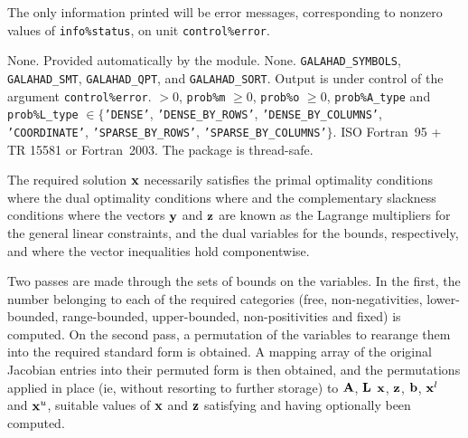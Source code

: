 \documentclass{galahad}
\begin{document}
\galinfo
The only information printed will be error messages, corresponding to 
nonzero values of {\tt info\%status}, on unit {\tt control\%error}. 


\galgeneral

\galcommon None.
\galworkspace Provided automatically by the module.
\galroutines None. 
\galmodules 
{\tt GALAHAD\_SY\-M\-BOLS}, 
{\tt GALAHAD\_SMT}, 
{\tt GALAHAD\_QPT},
and {\tt GALAHAD\_SORT}.
\galio Output is under control of the argument {\tt control\%error}.
 $> 0$, {\tt prob\%m} $\geq  0$, 
 {\tt prob\%o} $\geq  0$, 
 {\tt prob\%A\_type} and {\tt prob\%L\_type} $\in \{${\tt 'DENSE'}, 
 {\tt 'DENSE\_BY\_ROWS'},  {\tt 'DENSE\_BY\_COLUMNS'}, 
 {\tt 'COORDINATE'}, {\tt 'SPARSE\_BY\_ROWS'},
 {\tt 'SPARSE\_BY\_COLUMNS'}$\}$. 
\galportability ISO Fortran~95 + TR 15581 or Fortran~2003. 
The package is thread-safe.


\galmethod
The required solution ${\mathbf{x}}$ necessarily satisfies 
the primal optimality conditions
where
the dual optimality conditions
where
and the complementary slackness conditions 
where the vectors ${\mathbf{y}}$ and ${\mathbf{z}}$ are 
known as the Lagrange multipliers for
the general linear constraints, and the dual variables for the bounds,
respectively, and where the vector inequalities hold componentwise.

Two passes are made through the sets of bounds on the variables. 
In the first, the number belonging to each of the required categories 
(free, non-negativities, lower-bounded, range-bounded, 
upper-bounded, non-positivities and fixed) is computed. On the second pass, a 
permutation of the variables to rearange them into the required standard form 
is obtained. A mapping array of the original Jacobian entries into their 
permuted form is then obtained, and the permutations applied in place 
(ie, without resorting to further storage) to ${\mathbf{A}}$, ${\mathbf{L}}$ ${\mathbf{x}}$, ${\mathbf{z}}$, 
${\mathbf{b}}$, 
${\mathbf{x}}^l$ and ${\mathbf{x}}^u$, suitable values of ${\mathbf{x}}$ and ${\mathbf{z}}$ 
satisfying  and  having optionally been computed. 
 
\end{document}
